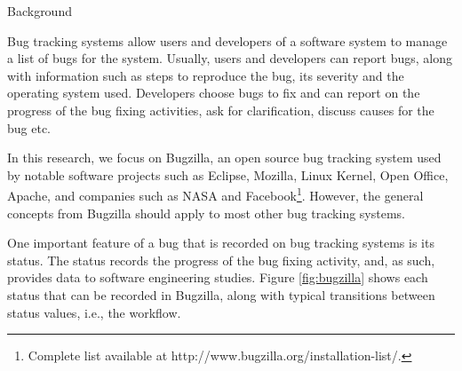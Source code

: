 \begin{section}{Background}


Bug tracking systems allow users and developers of a software system to manage a list of bugs for the system. Usually, users and developers can report bugs, along with information such as steps to reproduce the bug, its severity and the operating system used. Developers choose bugs to fix and can report on the progress of the bug fixing activities, ask for clarification, discuss causes for the bug etc.

In this research, we focus on Bugzilla, an open source bug tracking system used by notable software projects such as Eclipse, Mozilla, Linux Kernel, Open Office, Apache, and companies such as NASA and Facebook\footnote{Complete list available at http://www.bugzilla.org/installation-list/.}. However, the general concepts from Bugzilla should apply to most other bug tracking systems.

One important feature of a bug that is recorded on bug tracking systems is its status. The status records the progress of the bug fixing activity, and, as such, provides data to software engineering studies. Figure \ref{fig:bugzilla} shows each status that can be recorded in Bugzilla, along with typical transitions between status values, i.e., the workflow.


\end{section}
